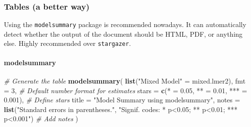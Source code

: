 \documentclass[
]{article}
\newenvironment{Shaded}{\begin{snugshade}}{\end{snugshade}}
\newcommand{\AttributeTok}[1]{\textcolor[rgb]{0.13,0.29,0.53}{#1}}
\newcommand{\CommentTok}[1]{\textcolor[rgb]{0.56,0.35,0.01}{\textit{#1}}}
\newcommand{\DecValTok}[1]{\textcolor[rgb]{0.00,0.00,0.81}{#1}}
\newcommand{\FloatTok}[1]{\textcolor[rgb]{0.00,0.00,0.81}{#1}}
\newcommand{\FunctionTok}[1]{\textcolor[rgb]{0.13,0.29,0.53}{\textbf{#1}}}
\newcommand{\NormalTok}[1]{#1}
\newcommand{\OtherTok}[1]{\textcolor[rgb]{0.56,0.35,0.01}{#1}}
\newcommand{\StringTok}[1]{\textcolor[rgb]{0.31,0.60,0.02}{#1}}
\begin{document}
\subsubsection{Tables (a better way)}\label{tables-a-better-way}

Using the \texttt{modelsummary} package is recommended nowadays. It can
automatically detect whether the output of the document should be HTML,
PDF, or anything else. Highly recommended over \texttt{stargazer}.

\paragraph{modelsummary}\label{modelsummary}

\begin{Shaded}
\begin{Highlighting}[]
\CommentTok{\# Generate the table}
\FunctionTok{modelsummary}\NormalTok{(}
  \FunctionTok{list}\NormalTok{(}\StringTok{"Mixed Model"} \OtherTok{=}\NormalTok{ mixed.lmer2),}
  \AttributeTok{fmt =} \DecValTok{3}\NormalTok{,                             }\CommentTok{\# Default number format for estimates}
  \AttributeTok{stars =} \FunctionTok{c}\NormalTok{(}\StringTok{\textquotesingle{}*\textquotesingle{}} \OtherTok{=} \FloatTok{0.05}\NormalTok{, }\StringTok{\textquotesingle{}**\textquotesingle{}} \OtherTok{=} \FloatTok{0.01}\NormalTok{, }\StringTok{\textquotesingle{}***\textquotesingle{}} \OtherTok{=} \FloatTok{0.001}\NormalTok{), }\CommentTok{\# Define stars}
  \AttributeTok{title =} \StringTok{"Model Summary using modelsummary"}\NormalTok{,}
  \AttributeTok{notes =} \FunctionTok{list}\NormalTok{(}\StringTok{"Standard errors in parentheses."}\NormalTok{,}
               \StringTok{"Signif. codes: * p\textless{}0.05; ** p\textless{}0.01; *** p\textless{}0.001"}\NormalTok{) }\CommentTok{\# Add notes}
\NormalTok{)}
\end{Highlighting}
\end{Shaded}
\end{document}
